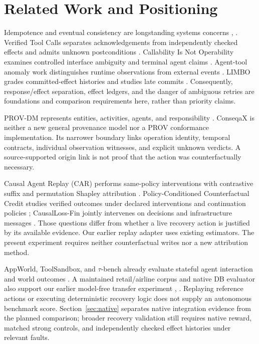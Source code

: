 \documentclass[conference]{IEEEtran}
\begin{document}
\section{Related Work and Positioning}

Idempotence and eventual consistency are longstanding systems concerns \cite{helland}, \cite{vogels}. Verified Tool Calls separates acknowledgements from independently checked effects and admits unknown postconditions \cite{verified}. Callability Is Not Operability examines controlled interface ambiguity and terminal agent claims \cite{operability}. Agent-tool anomaly work distinguishes runtime observations from external events \cite{agenttool}. LIMBO grades committed-effect histories and studies late commits \cite{limbo}. Consequently, response/effect separation, effect ledgers, and the danger of ambiguous retries are foundations and comparison requirements here, rather than priority claims.

PROV-DM represents entities, activities, agents, and responsibility \cite{prov}. ConseqaX is neither a new general provenance model nor a PROV conformance implementation. Its narrower boundary links operation identity, temporal contracts, individual observation witnesses, and explicit unknown verdicts. A source-supported origin link is not proof that the action was counterfactually necessary.

Causal Agent Replay (CAR) performs same-policy interventions with contrastive suffix and permutation Shapley attribution \cite{car}. Policy-Conditioned Counterfactual Credit studies verified outcomes under declared interventions and continuation policies \cite{pccc}; CausalLoss-Fin jointly intervenes on decisions and infrastructure messages \cite{causalloss}. Those questions differ from whether a live recovery action is justified by its available evidence. Our earlier replay adapter uses existing estimators. The present experiment requires neither counterfactual writes nor a new attribution method.

AppWorld, ToolSandbox, and $\tau$-bench already evaluate stateful agent interaction and world outcomes \cite{appworld,toolsandbox,taubench}. A maintained retail/airline corpus and native DB evaluator also support our earlier model-free transfer experiment \cite{tau3tasks}, \cite{tau3eval}. Replaying reference actions or executing deterministic recovery logic does not supply an autonomous benchmark score. Section~\ref{sec:native} separates native integration evidence from the planned comparison; broader recovery validation still requires native reward, matched strong controls, and independently checked effect histories under relevant faults.
\end{document}
